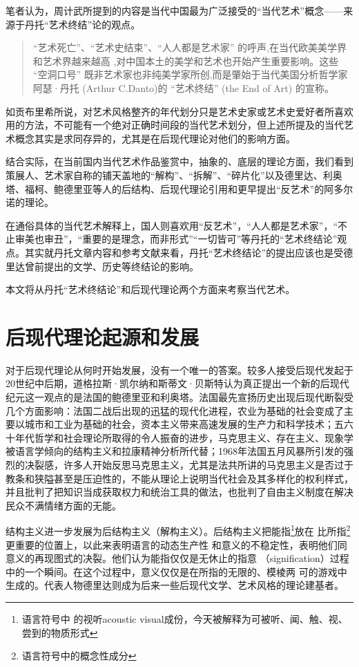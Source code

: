 笔者认为，周计武所提到的内容是当代中国最为广泛接受的“当代艺术”概念——来源于丹托“艺术终结”论的观点。
\begin{quotation}
  “艺术死亡”、“艺术史结束”、“人人都是艺术家” 的呼声,在当代欧美美学界和艺术界越来越高 ,对中国本土的美学和艺术也开始产生重要影响。这些 “空洞口号” 既非艺术家也非纯美学家所创,而是肇始于当代美国分析哲学家阿瑟·丹托 (Arthur C.Danto)的 “艺术终结” (the End of Art) 的宣称。\cite{boduoyishu}
\end{quotation}

如贡布里希所说，对艺术风格整齐的年代划分只是艺术史家或艺术史爱好者所喜欢用的方法，不可能有一个绝对正确时间段的当代艺术划分，但上述所提及的当代艺术概念其实是求同存异的，尤其是在后现代理论对他们的影响方面。

结合实际，在当前国内当代艺术作品鉴赏中，抽象的、底层的理论方面，我们看到策展人、艺术家自称的铺天盖地的“解构”、“拆解”、“碎片化”以及德里达、利奥塔、福柯、鲍德里亚等人的后结构、后现代理论引用和更早提出“反艺术”的阿多尔诺的理论。

在通俗具体的当代艺术解释上，国人则喜欢用“反艺术”，“人人都是艺术家”，“不止审美也审丑”，“重要的是理念，而非形式”“一切皆可”等丹托的“艺术终结论”观点。其实就丹托文章内容和参考文献来看，丹托“艺术终结论”的提出应该也是受德里达曾前提出的文学、历史等终结论的影响。

本文将从丹托“艺术终结论”和后现代理论两个方面来考察当代艺术。

\section{后现代理论起源和发展} 

对于后现代理论从何时开始发展，没有一个唯一的答案。较多人接受后现代发起于20世纪中后期，道格拉斯·凯尔纳和斯蒂文·贝斯特认为真正提出一个新的后现代纪元这一观点的是法国的鲍德里亚和利奥塔。法国最先宣扬历史出现后现代断裂受几个方面影响：法国二战后出现的迅猛的现代化进程，农业为基础的社会变成了主要以城市和工业为基础的社会，资本主义带来高速发展的生产力和科学技术；五六十年代哲学和社会理论所取得的令人振奋的进步，马克思主义、存在主义、现象学被语言学倾向的结构主义和拉康精神分析所代替；1968年法国五月风暴所引发的强烈的决裂感，许多人开始反思马克思主义，尤其是法共所讲的马克思主义是否过于教条和狭隘甚至是压迫性的，不能从理论上说明当代社会及其多样化的权利样式，并且批判了把知识当成获取权力和统治工具的做法，也批判了自由主义制度在解决民众不满情绪方面的无能。

结构主义进一步发展为后结构主义（解构主义）。后结构主义把能指\footnote{语言符号中
  的视听acoustic visual成份，今天被解释为可被听、闻、触、视、尝到的物质形式}放在
比所指\footnote{语言符号中的概念性成分}更重要的位置上，以此来表明语言的动态生产性
和意义的不稳定性，表明他们同意义的再现图式的决裂。他们认为能指仅仅是无休止的指意
（signification）过程中的一个瞬间。在这个过程中，意义仅仅是在所指的无限的、模棱两
可的游戏中生成的。代表人物德里达则成为后来一些后现代文学、艺术风格的理论建基者。

